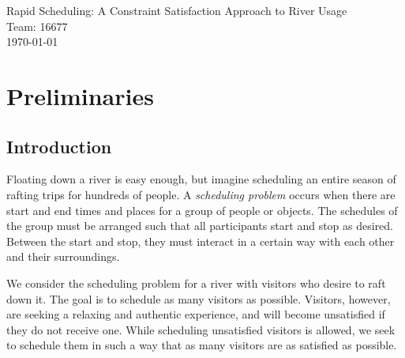 \documentclass[11pt]{article} %
\begin{document}
\begin{titlepage}
    \vspace*{\fill}
    \begin{center}
      \Huge{Rapid Scheduling: A Constraint Satisfaction
        Approach to River Usage}\\[0.5cm]
      \Large{Team: 16677}\\[0.4cm]
      \today
    \end{center}
    \vspace*{\fill}
  \end{titlepage}
\newpage
\vspace*{\fill}
\tableofcontents
\vspace*{\fill}
\newpage

\section{Preliminaries}
\label{sec:prelims}

\subsection{Introduction}
\label{sec:intro}
Floating down a river is easy enough, but imagine scheduling an entire
season of rafting trips for hundreds of people.  A \textit{scheduling problem}
occurs when there are start and end times and places for a group of people
or objects. The schedules of the group must be arranged such that all
participants start and stop as desired. Between the start and stop, they
must interact in a certain way with each other and their surroundings.

We consider the scheduling problem for a river with visitors who desire to
raft down it. The goal is to schedule as many visitors as possible.
Visitors, however, are seeking a relaxing and authentic experience, and
will become unsatisfied if they do not receive one. While scheduling
unsatisfied visitors is allowed, we seek to schedule them in such a way
that as many visitors are as satisfied as possible.
\end{document}
